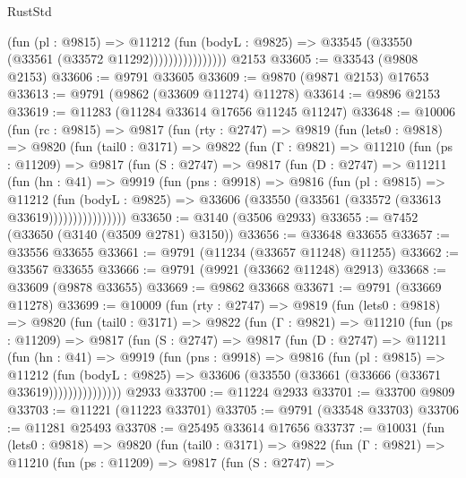 \begin{lexlean}{RustStd}
\begin{coremodule}
                          (fun (pl : @9815) =>
                          @11212
                            (fun (bodyL : @9825) =>
                            @33545 (@33550 (@33561 (@33572 @11292))))))))))))))))
    @2153
@33605 := @33543 (@9808 @2153)
@33606 := @9791 @33605
@33609 := @9870 (@9871 @2153) @17653
@33613 := @9791 (@9862 (@33609 @11274) @11278)
@33614 := @9896 @2153
@33619 := @11283 (@11284 @33614 @17656 @11245 @11247)
@33648 := @10006
    (fun (rc : @9815) =>
    @9817
      (fun (rty : @2747) =>
      @9819
        (fun (lets0 : @9818) =>
        @9820
          (fun (tail0 : @3171) =>
          @9822
            (fun (Γ : @9821) =>
            @11210
              (fun (ps : @11209) =>
              @9817
                (fun (S : @2747) =>
                @9817
                  (fun (D : @2747) =>
                  @11211
                    (fun (hn : @41) =>
                    @9919
                      (fun (pns : @9918) =>
                      @9816
                        (fun (pl : @9815) =>
                        @11212
                          (fun (bodyL : @9825) =>
                          @33606 (@33550 (@33561 (@33572 (@33613 @33619))))))))))))))))
@33650 := @3140 (@3506 @2933)
@33655 := @7452 (@33650 (@3140 (@3509 @2781) @3150))
@33656 := @33648 @33655
@33657 := @33556 @33655
@33661 := @9791 (@11234 (@33657 @11248) @11255)
@33662 := @33567 @33655
@33666 := @9791 (@9921 (@33662 @11248) @2913)
@33668 := @33609 (@9878 @33655)
@33669 := @9862 @33668
@33671 := @9791 (@33669 @11278)
@33699 := @10009
    (fun (rty : @2747) =>
    @9819
      (fun (lets0 : @9818) =>
      @9820
        (fun (tail0 : @3171) =>
        @9822
          (fun (Γ : @9821) =>
          @11210
            (fun (ps : @11209) =>
            @9817
              (fun (S : @2747) =>
              @9817
                (fun (D : @2747) =>
                @11211
                  (fun (hn : @41) =>
                  @9919
                    (fun (pns : @9918) =>
                    @9816
                      (fun (pl : @9815) =>
                      @11212
                        (fun (bodyL : @9825) =>
                        @33606 (@33550 (@33661 (@33666 (@33671 @33619)))))))))))))))
    @2933
@33700 := @11224 @2933
@33701 := @33700 @9809
@33703 := @11221 (@11223 @33701)
@33705 := @9791 (@33548 @33703)
@33706 := @11281 @25493
@33708 := @25495 @33614 @17656
@33737 := @10031
    (fun (lets0 : @9818) =>
    @9820
      (fun (tail0 : @3171) =>
      @9822
        (fun (Γ : @9821) =>
        @11210
          (fun (ps : @11209) =>
          @9817
            (fun (S : @2747) =>

\end{coremodule}
\end{lexlean}
